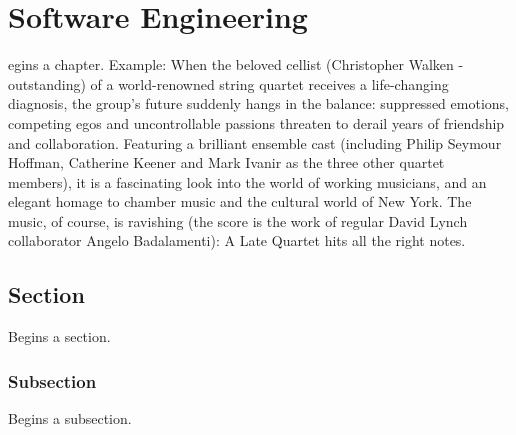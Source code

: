 \let\textcircled=\pgftextcircled
\chapter{Software Engineering}
\label{chap:software-engineering}

egins a chapter. Example: When the beloved cellist (Christopher Walken - outstanding) of a world-renowned string quartet receives a life-changing diagnosis, the group's future suddenly hangs in the balance: suppressed emotions, competing egos and uncontrollable passions threaten to derail years of friendship and collaboration. Featuring a brilliant ensemble cast (including Philip Seymour Hoffman, Catherine Keener and Mark Ivanir as the three other quartet members), it is a fascinating look into the world of working musicians, and an elegant homage to chamber music and the cultural world of New York. The music, of course, is ravishing (the score is the work of regular David Lynch collaborator Angelo Badalamenti): A Late Quartet hits all the right notes.

\section{Section}
\label{sec:sec01}

Begins a section.

\subsection{Subsection}
\label{subsec:subsec01}

Begins a subsection.